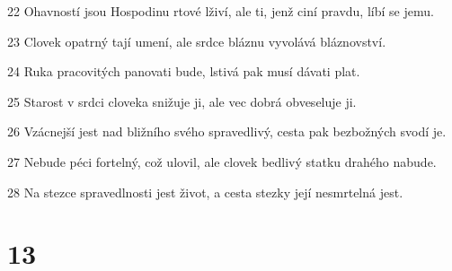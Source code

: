 \par 22 Ohavností jsou Hospodinu rtové lživí, ale ti, jenž ciní pravdu, líbí se jemu.
\par 23 Clovek opatrný tají umení, ale srdce bláznu vyvolává bláznovství.
\par 24 Ruka pracovitých panovati bude, lstivá pak musí dávati plat.
\par 25 Starost v srdci cloveka snižuje ji, ale vec dobrá obveseluje ji.
\par 26 Vzácnejší jest nad bližního svého spravedlivý, cesta pak bezbožných svodí je.
\par 27 Nebude péci fortelný, což ulovil, ale clovek bedlivý statku drahého nabude.
\par 28 Na stezce spravedlnosti jest život, a cesta stezky její nesmrtelná jest.

\chapter{13}

